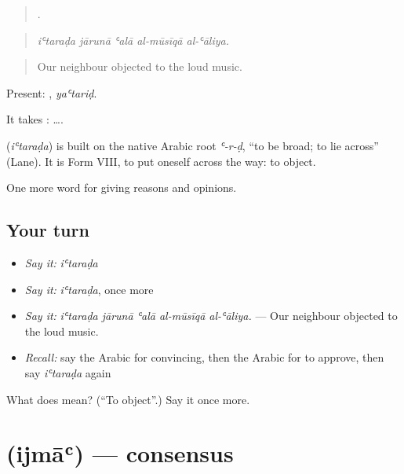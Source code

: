 \begin{quote}
    .
\end{quote}

\begin{quote}
\emph{iʿtaraḍa jārunā ʿalā al-mūsīqā al-ʿāliya.}
\end{quote}

\begin{quote}
Our neighbour objected to the loud music.
\end{quote}

Present: , \emph{yaʿtariḍ}.

It takes :   ….

\begin{cousinweb}
\textbf{} (\emph{iʿtaraḍa}) is built on the native Arabic root \emph{ʿ-r-ḍ}, \textquotedblleft{}to be broad; to lie across\textquotedblright{} (Lane). It is Form VIII, to put oneself across the way: to object.
\end{cousinweb}

\begin{grammarlens}[title={What you've built}]
One more word for giving reasons and opinions.
\end{grammarlens}

\subsection*{Your turn}
\begin{itemize}
\raggedright
  \item \emph{Say it:} \emph{iʿtaraḍa}
  \item \emph{Say it:} \emph{iʿtaraḍa}, once more
  \item \emph{Say it:} \emph{iʿtaraḍa jārunā ʿalā al-mūsīqā al-ʿāliya.} — Our neighbour objected to the loud music.
  \item \emph{Recall:} say the Arabic for convincing, then the Arabic for to approve, then say \emph{iʿtaraḍa} again
\end{itemize}

\begin{tcolorbox}[breakable,colback=teal!4,colframe=teal!35!black,title={Before you move on}]
What does  mean? (\textquotedblleft{}To object\textquotedblright{}.) Say it once more.
\end{tcolorbox}
\section[\texorpdfstring{\ar{إجماع} (ijmāʿ)}{إجماع (ijmāʿ)}]{ (ijmāʿ) — consensus}


